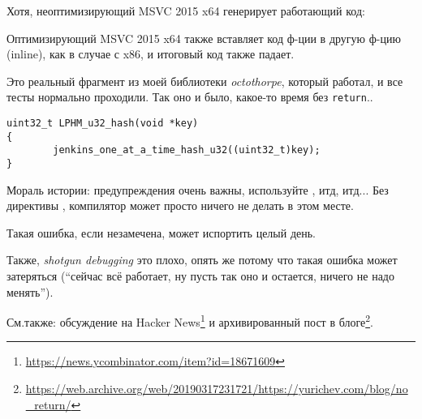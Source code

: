 

Хотя, неоптимизирующий MSVC 2015 x64 генерирует работающий код:



Оптимизирующий MSVC 2015 x64 также вставляет код ф-ции в другую ф-цию (inline), как в случае с x86, и итоговый код также падает.

\myhrule{}

Это реальный фрагмент из моей библиотеки \emph{octothorpe}, который работал, и все тесты нормально проходили.
Так оно и было, какое-то время без \verb|return|..

\begin{lstlisting}
uint32_t LPHM_u32_hash(void *key)
{
        jenkins_one_at_a_time_hash_u32((uint32_t)key);
}
\end{lstlisting}

\myhrule{}

Мораль истории: предупреждения очень важны, используйте , итд, итд...
Без директивы , компилятор может просто ничего не делать в этом месте.

Такая ошибка, если незамечена, может испортить целый день.

Также, \emph{shotgun debugging}
это плохо, опять же потому что такая ошибка может затеряться
(``сейчас всё работает, ну пусть так оно и остается, ничего не надо менять'').

См.также: обсуждение на Hacker News\footnote{\url{https://news.ycombinator.com/item?id=18671609}}
и архивированный пост в блоге\footnote{\url{https://web.archive.org/web/20190317231721/https://yurichev.com/blog/no_return/}}.
